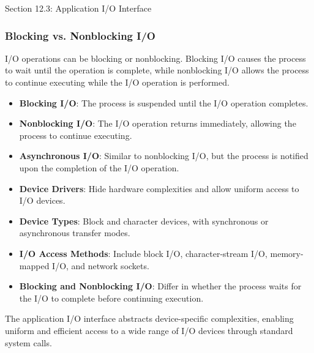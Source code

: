 \begin{notes}{Section 12.3: Application I/O Interface}
\begin{highlight}
    \end{highlight}
    
    \subsubsection*{Blocking vs. Nonblocking I/O}
    
    I/O operations can be blocking or nonblocking. Blocking I/O causes the process to wait until the operation is complete, while nonblocking I/O allows the process to continue executing while the 
    I/O operation is performed.
    
    \begin{highlight}
    
        \begin{itemize}
            \item \textbf{Blocking I/O}: The process is suspended until the I/O operation completes.
            \item \textbf{Nonblocking I/O}: The I/O operation returns immediately, allowing the process to continue executing.
            \item \textbf{Asynchronous I/O}: Similar to nonblocking I/O, but the process is notified upon the completion of the I/O operation.
        \end{itemize}
    
    \end{highlight}
    
    \begin{highlight}
    
        \begin{itemize}
            \item \textbf{Device Drivers}: Hide hardware complexities and allow uniform access to I/O devices.
            \item \textbf{Device Types}: Block and character devices, with synchronous or asynchronous transfer modes.
            \item \textbf{I/O Access Methods}: Include block I/O, character-stream I/O, memory-mapped I/O, and network sockets.
            \item \textbf{Blocking and Nonblocking I/O}: Differ in whether the process waits for the I/O to complete before continuing execution.
        \end{itemize}
    
    The application I/O interface abstracts device-specific complexities, enabling uniform and efficient access to a wide range of I/O devices through standard system calls.
    
    \end{highlight}
\end{notes}

